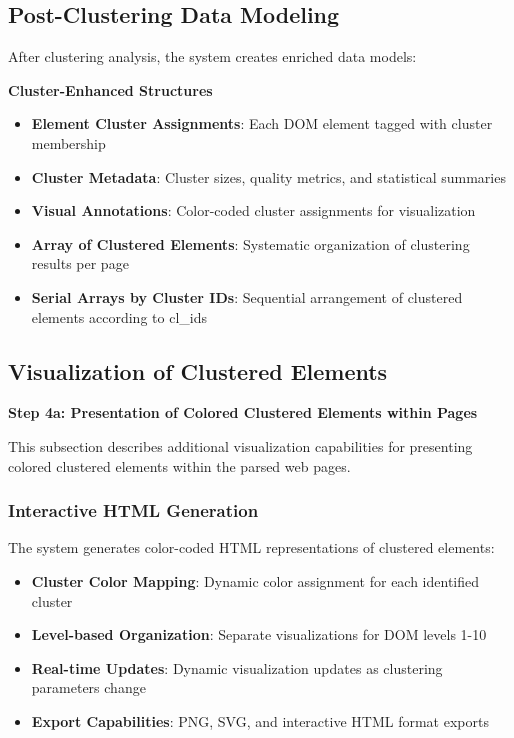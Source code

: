 \subsection{Post-Clustering Data Modeling}
\label{subsec:post-clustering-modeling}

After clustering analysis, the system creates enriched data models:

\textbf{Cluster-Enhanced Structures}
\begin{itemize}
    \item \textbf{Element Cluster Assignments}: Each DOM element tagged with cluster membership
    \item \textbf{Cluster Metadata}: Cluster sizes, quality metrics, and statistical summaries
    \item \textbf{Visual Annotations}: Color-coded cluster assignments for visualization
    \item \textbf{Array of Clustered Elements}: Systematic organization of clustering results per page
    \item \textbf{Serial Arrays by Cluster IDs}: Sequential arrangement of clustered elements according to cl_ids
\end{itemize}

\subsection{Visualization of Clustered Elements}
\label{subsec:more-visualization}

\textbf{Step 4a: Presentation of Colored Clustered Elements within Pages}

This subsection describes additional visualization capabilities for presenting colored clustered elements within the parsed web pages.

\subsubsection{Interactive HTML Generation}
The system generates color-coded HTML representations of clustered elements:

\begin{itemize}
    \item \textbf{Cluster Color Mapping}: Dynamic color assignment for each identified cluster
    \item \textbf{Level-based Organization}: Separate visualizations for DOM levels 1-10
    \item \textbf{Real-time Updates}: Dynamic visualization updates as clustering parameters change
    \item \textbf{Export Capabilities}: PNG, SVG, and interactive HTML format exports
\end{itemize}

